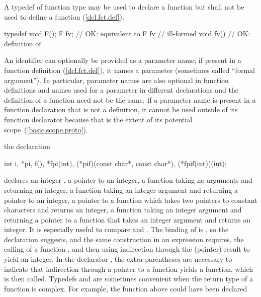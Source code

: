 \pnum
{}%
A typedef of function type may be used to declare a function but shall not be
used to define a function (\ref{dcl.fct.def}).
\enterexample

\begin{codeblock}
typedef void F();
F  fv;              // OK: equivalent to 
F  fv { }           // ill-formed
void fv() { }       // OK: definition of 
\end{codeblock}
\exitexample

\pnum
An identifier can optionally be provided as a parameter name;
if present in a function definition (\ref{dcl.fct.def}), it names a parameter (sometimes called ``formal argument'').
\enternote
In particular, parameter names are also optional in function definitions
and names used for a parameter in different declarations and the definition
of a function need not be the same.
If a parameter name is present in a function declaration that is not a definition,
it cannot be used outside of
its function declarator because that is the extent of its potential scope~(\ref{basic.scope.proto}).
\exitnote

\pnum
\enterexample
the declaration

%
\begin{codeblock}
int i,
    *pi,
    f(),
    *fpi(int),
    (*pif)(const char*, const char*),
    (*fpif(int))(int);
\end{codeblock}

declares an integer
,
a pointer
to an integer,
a function
taking no arguments and returning an integer,
a function
taking an integer argument and returning a pointer to an integer,
a pointer
to a function which
takes two pointers to constant characters and returns an integer,
a function
taking an integer argument and returning a pointer to a function that takes an integer argument and returns an integer.
It is especially useful to compare
and
.
The binding of
is
,
so the declaration suggests,
and the same construction in an expression
requires, the calling of a function
,
and then using indirection through the (pointer) result
to yield an integer.
In the declarator
,
the extra parentheses are necessary to indicate that indirection through
a pointer to a function yields a function, which is then called.
\exitexample
\enternote
Typedefs and  are sometimes convenient when the return type of a function is complex.
For example,
the function
above could have been declared

